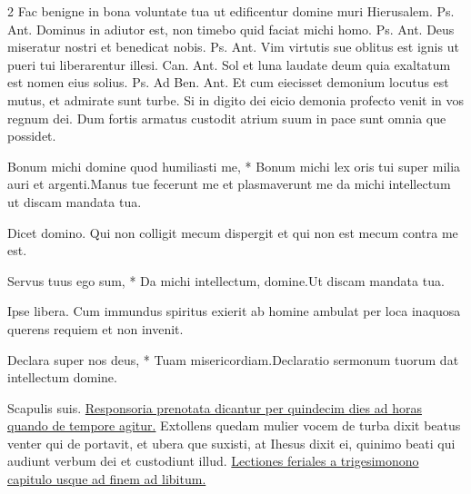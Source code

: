 \begin{multicols*}{2}
 Fac benigne in bona voluntate tua ut edificentur domine muri Hierusalem. {\color{Red} Ps.}  {\color{Red} Ant.} Dominus in adiutor est, non timebo quid faciat michi homo. {\color{Red} Ps.}  {\color{Red} Ant.} Deus miseratur nostri et benedicat nobis. {\color{Red} Ps.}  {\color{Red} Ant.} Vim virtutis sue oblitus est ignis ut pueri tui liberarentur illesi. {\color{Red} Can.}  {\color{Red} Ant.} Sol et luna laudate deum quia exaltatum est nomen eius solius. {\color{Red} Ps.}  {\color{Red} Ad Ben. Ant.} Et cum eiecisset demonium locutus est mutus, et admirate sunt turbe.
 Si in digito dei eicio demonia profecto venit in vos regnum dei.
 Dum fortis armatus custodit atrium suum in pace sunt omnia que possidet.
\begin{responsory-breve}
{Bonum michi domine quod humiliasti me, * Bonum michi lex oris tui super milia auri et argenti.}{Manus tue fecerunt me et plasmaverunt me da michi intellectum ut discam mandata tua.}
\end{responsory-breve}%
\V Dicet domino.
 Qui non colligit mecum dispergit et qui non est mecum contra me est.
\begin{responsory-breve}
{Servus tuus ego sum, * Da michi intellectum, domine.}{Ut discam mandata tua.}
\end{responsory-breve}%
\V Ipse libera.
 Cum immundus spiritus exierit ab homine ambulat per loca inaquosa querens requiem et non invenit.
\begin{responsory-breve}
{Declara super nos deus, * Tuam misericordiam.}{Declaratio sermonum tuorum dat intellectum domine.}
\end{responsory-breve}%
\V Scapulis suis.
\newline \ul{Responsoria prenotata dicantur per quindecim dies ad horas quando de tempore agitur.}
 Extollens quedam mulier vocem de turba dixit beatus venter qui de portavit, et ubera que suxisti, at Ihesus dixit ei, quinimo beati qui audiunt verbum dei et custodiunt illud.
\newline \ul{Lectiones feriales a trigesimonono capitulo usque ad finem ad libitum.}

\end{multicols*}
